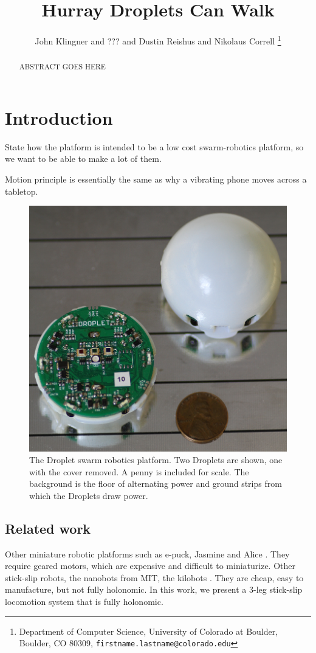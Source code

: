 \documentclass[letterpaper, 10pt, conference]{ieeeconf}
\title{\LARGE \bf
Hurray Droplets Can Walk
}
\author{ John Klingner and ??? and Dustin Reishus and Nikolaus Correll%
\thanks{Department of Computer Science,
University of Colorado at Boulder,
 Boulder, CO 80309,
{\tt\small firstname.lastname{@}colorado.edu}}%
}
\begin{document}
\maketitle

\begin{abstract}
ABSTRACT GOES HERE
\end{abstract}

\section{Introduction}
State how the platform is intended to be a low cost swarm-robotics platform, so we want to be able to make a lot of them.

Motion principle is essentially the same as why a vibrating phone moves across a tabletop.

\begin{figure}[h]
	\centering
		\includegraphics[width=0.8\columnwidth]{./Images/droplets.png}
	\caption{The Droplet swarm robotics platform. Two Droplets are shown, one with the cover removed. A penny is included for scale. The background is the floor of alternating power and ground strips from which the Droplets draw power.}
	\label{droplets}
\end{figure}

\subsection{Related work}
Other miniature robotic platforms such as e-puck, Jasmine and Alice \cite{}. They require geared motors, which are expensive and difficult to miniaturize. Other stick-slip robots, the nanobots from MIT, the kilobots \cite{}. They are cheap, easy to manufacture, but not fully holonomic. In this work, we present a 3-leg stick-slip locomotion system that is fully holonomic. 
\end{document}
